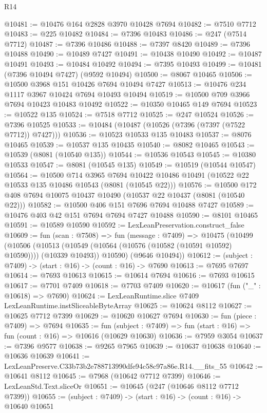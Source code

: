 \begin{lexlean}{R14}
\begin{coremodule}
@10481 := @10476 @164 @2828 @3970 @10428 @7694
@10482 := @7510 @7712
@10483 := @225 @10482
@10484 := @7396 @10483
@10486 := @247 (@7514 @7712)
@10487 := @7396 @10486
@10488 := @7397 @8420
@10489 := @7396 @10488
@10490 := @10489 @7427
@10491 := @10438 @10490
@10492 := @10487 @10491
@10493 := @10484 @10492
@10494 := @7395 @10493
@10499 := @10481 (@7396 @10494 @7427) (@9592 @10494)
@10500 := @8067 @10465
@10506 := @10500 @3968 @151 @10426 @7694 @10494 @7427
@10513 := @10476 @234 @1117 @3967 @10424 @7694 @10493 @10494
@10519 := @10500 @709 @3966 @7694 @10423 @10483 @10492
@10522 := @10350 @10465 @149 @7694
@10523 := @10522 @135
@10524 := @7518 @7712
@10525 := @247 @10524
@10526 := @7396 @10525
@10533 := @10484 (@10487 (@10526 (@7396 (@7397 (@7522 @7712)) @7427)))
@10536 := @10523 @10533 @135 @10483
@10537 := @8076 @10465
@10539 := @10537 @135 @10435
@10540 := @8082 @10465
@10543 := @10539 (@8081 (@10540 @135))
@10544 := @10536 @10543
@10545 := @10380 @10533
@10547 := @8081 (@10545 @135)
@10549 := @10519 (@10544 @10547)
@10564 := @10500
    @714
    @3965
    @7694
    @10422
    @10486
    @10491
    (@10522 @22 @10533 @135 @10486 @10543 (@8081 (@10545 @22)))
@10576 := @10500 @172 @408 @7694 @10075 @10437 @10490 (@10537 @22 @10437 (@8081 (@10540 @22)))
@10582 := @10500 @406 @151 @7696 @7694 @10488 @7427
@10589 := @10476 @403 @42 @151 @7694 @7694 @7427 @10488
@10590 := @8101 @10465
@10591 := @10589 @10590
@10592 := LexLeanPreservation.construct_false
@10609 := fun (scan : @7508) =>
  fun (message : @7409) =>
  @10475
    (@10499
      (@10506
        (@10513 (@10549 (@10564 (@10576 (@10582 (@10591 @10592) @10590)))) (@10339 @10493))
        @10590)
      (@9646 @10494))
@10612 := (subject : @7409) -> (start : @16) -> (count : @16) -> @7690
@10613 := @7695 @7697
@10614 := @7693 @10613
@10615 := @10614 @7694
@10616 := @7693 @10615
@10617 := @7701 @7409
@10618 := @7703 @7409
@10620 := @10617 (fun ("_" : @10618) => @7690)
@10624 := LexLeanRuntime.slice @7409 LexLeanRuntime.instSliceableByteArray
@10625 := @10624 @8112
@10627 := @10625 @7712 @7399
@10629 := @10620 @10627 @7694
@10630 := fun (piece : @7409) => @7694
@10635 := fun (subject : @7409) => fun (start : @16) => fun (count : @16) => @10616 (@10629 @10630)
@10636 := @7959 @3054
@10637 := @7396 @9577
@10638 := @9265 @7965
@10639 := @10637 @10638
@10640 := @10636 @10639
@10641 := LexLeanPreserve.C33b73b2e788713990dfe94c58c97a86e.R14.__fits_55
@10642 := @10641 @8112
@10645 := @7968 (@10642 @7712 @7399)
@10646 := LexLeanStd.Text.sliceOr
@10651 := @10645 (@247 (@10646 @8112 @7712 @7399))
@10655 := (subject : @7409) -> (start : @16) -> (count : @16) -> @10640 @10651

\end{coremodule}
\end{lexlean}
